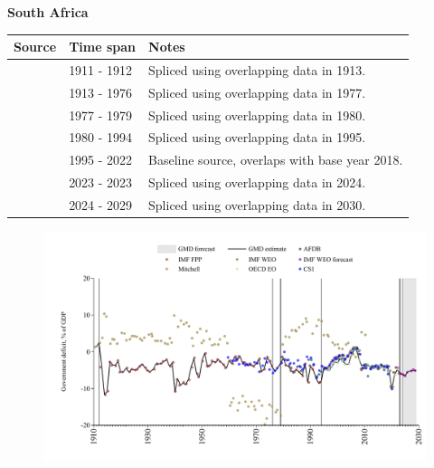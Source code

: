 \documentclass[12pt,a4paper,landscape]{article}
\begin{document}
\begin{adjustbox}{max totalsize={\paperwidth}{\paperheight},center}
\begin{minipage}[t][\textheight][t]{\textwidth}
\vspace*{0.5cm}
{}
\begin{center}
{\Large\bfseries South Africa}
\end{center}
\vspace{0.5cm}
\begin{table}[H]
\centering
\small
\begin{tabular}{|l|l|l|}
\hline
\textbf{Source} & \textbf{Time span} & \textbf{Notes} \\
\hline
\rowcolor{white}\cite{Mitchell}& 1911 - 1912 &Spliced using overlapping data in 1913.\\
\rowcolor{lightgray}\cite{IMF_FPP}& 1913 - 1976 &Spliced using overlapping data in 1977.\\
\rowcolor{white}\cite{CS1_ZAF}& 1977 - 1979 &Spliced using overlapping data in 1980.\\
\rowcolor{lightgray}\cite{IMF_FPP}& 1980 - 1994 &Spliced using overlapping data in 1995.\\
\rowcolor{white}\cite{OECD_EO}& 1995 - 2022 &Baseline source, overlaps with base year 2018.\\
\rowcolor{lightgray}\cite{IMF_FPP}& 2023 - 2023 &Spliced using overlapping data in 2024.\\
\rowcolor{white}\cite{IMF_WEO_forecast}& 2024 - 2029 &Spliced using overlapping data in 2030.\\
\hline
\end{tabular}
\end{table}
\begin{figure}[H]
\centering
\includegraphics[width=\textwidth,height=0.6\textheight,keepaspectratio]{graphs/ZAF_govdef_GDP.pdf}
\end{figure}
\end{minipage}
\end{adjustbox}
\end{document}
